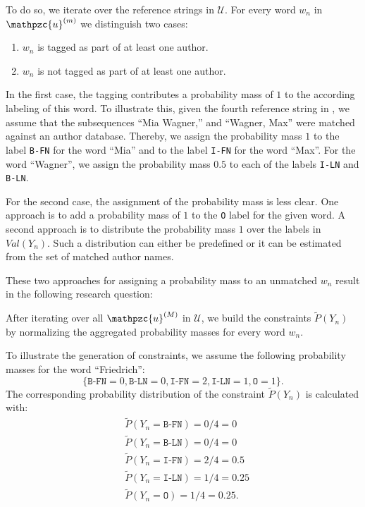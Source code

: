 To do so, we iterate over the reference strings in $\mathcal{U}$.
For every word $w_n$ in $\mathpzc{u}^{(m)}$ we distinguish two cases:
\begin{enumerate}
  \item $w_n$ is tagged as part of at least one author.
  \item $w_n$ is not tagged as part of at least one author.
\end{enumerate}

In the first case, the tagging contributes a probability mass of $1$ to the according labeling of this word.
To illustrate this, given the fourth reference string in , we assume that the subsequences ``Mia Wagner,{}'' and ``Wagner, Max'' were matched against an author database.
Thereby, we assign the probability mass $1$ to the label \texttt{B-FN} for the word ``Mia'' and to the label \texttt{I-FN} for the word ``Max''.
For the word ``Wagner'', we assign the probability mass $0.5$ to each of the labels \texttt{I-LN} and \texttt{B-LN}.

For the second case, the assignment of the probability mass is less clear.
One approach is to add a probability mass of $1$ to the \texttt{O} label for the given word.
A second approach is to distribute the probability mass $1$ over the labels in $\mathit{Val}(Y_n)$.
Such a distribution can either be predefined or it can be estimated from the set of matched author names.

These two approaches for assigning a probability mass to an unmatched $w_n$ result in the following research question:
\newcommand\researchquestionthree{}
\researchquestionthree%

After iterating over all $\mathpzc{u}^{(M)}$ in $\mathcal{U}$, we build the constraints $\tilde{P}(Y_n)$ by normalizing the aggregated probability masses for every word $w_n$.

\bigskip

To illustrate the generation of constraints, we assume the following probability masses for the word ``Friedrich'':
\begin{equation*}
  \{\texttt{B-FN}{=}0,\texttt{B-LN}{=}0,\texttt{I-FN}{=}2,\texttt{I-LN}{=}1,\texttt{O}{=}1\}.
\end{equation*}
The corresponding \gls{probability distribution} of the constraint $\tilde{P}(Y_n)$ is calculated with:
\begin{equation*}
\begin{split}
  &\tilde{P}(Y_n{=}\texttt{B-FN})=0/4=0\\
  &\tilde{P}(Y_n{=}\texttt{B-LN})=0/4=0\\
  &\tilde{P}(Y_n{=}\texttt{I-FN})=2/4=0.5\\
  &\tilde{P}(Y_n{=}\texttt{I-LN})=1/4=0.25\\
  &\tilde{P}(Y_n{=}\texttt{O})=1/4=0.25.
\end{split}
\end{equation*}

